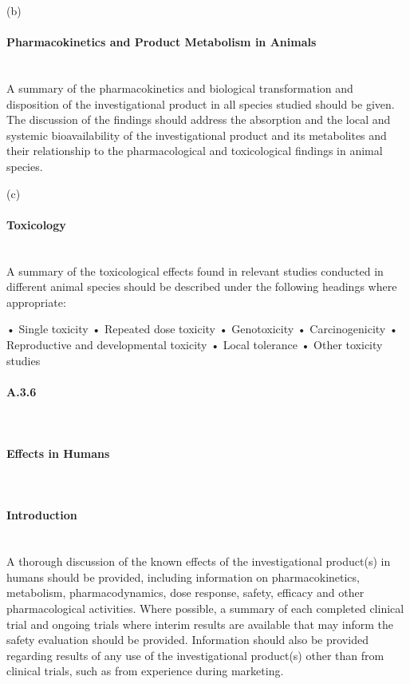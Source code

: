 \documentclass[11pt]{article}
\begin{document}
(b)


\paragraph{Pharmacokinetics and Product Metabolism in Animals}\mbox{}\\

A summary of the pharmacokinetics and biological transformation and disposition of the investigational product in all species studied should be given. The discussion of the findings should address the absorption and the local and systemic bioavailability of the investigational product and its metabolites and their relationship to the pharmacological and toxicological findings in animal species.


(c)


\paragraph{Toxicology}\mbox{}\\

A summary of the toxicological effects found in relevant studies conducted in different animal species should be described under the following headings where appropriate:


• Single toxicity • Repeated dose toxicity • Genotoxicity • Carcinogenicity • Reproductive and developmental toxicity • Local tolerance • Other toxicity studies


\paragraph{A.3.6}\mbox{}\\

\paragraph{Effects in Humans}\mbox{}\\

\paragraph{Introduction}\mbox{}\\

A thorough discussion of the known effects of the investigational product(s) in humans should be provided, including information on pharmacokinetics, metabolism, pharmacodynamics, dose response, safety, efficacy and other pharmacological activities. Where possible, a summary of each completed clinical trial and ongoing trials where interim results are available that may inform the safety evaluation should be provided. Information should also be provided regarding results of any use of the investigational product(s) other than from clinical trials, such as from experience during marketing.
\end{document}
